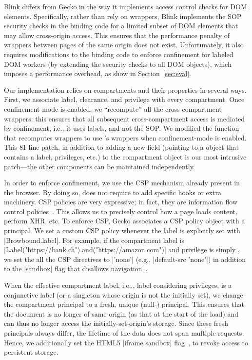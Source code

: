 Blink differs from Gecko in the way it implements access control checks for
DOM elements. 
%
Specifically, rather than rely on wrappers, Blink implements the SOP security
checks in the binding code for a limited subset of DOM elements that may allow
cross-origin access.
%
This ensures that the performance penalty of wrappers between pages of the same
origin does not exist.
%
Unfortunately, it also requires modifications to the binding code to enforce
confinement for labeled DOM workers (by extending the security checks to all
DOM objects), which imposes a  performance overhead, as show in
Section~\ref{sec:eval}.

Our implementation relies on compartments and their properties in
several ways.
%
First, we associate label, clearance, and privilege with every 
compartment.
%
Once confinement-mode is enabled, we ``recompute'' all the
cross-compartment wrappers: this ensures that all subsequent
cross-compartment access is mediated by confinement, i.e., it uses
labels, and not the SOP. %
%
We modified the function that recomputes wrappers to use \sys{}'s
wrappers when confinement-mode is enabled.
%
This 81-line patch, in addition to adding a new field (pointing to a \sys{}
object that contains a label, privileges, etc.) to the compartment
object is our most intrusive patch---the other \sys{} components can be
maintained independently.
 
%
In order to enforce confinement, we use the CSP mechanism already present 
in the browser. 
By doing so, \sys{} does not require to add specific hooks or extra machinery. 
CSP policies are very expressive; in fact, they are
information flow control policies~\cite{yang:2013:towards}. This allows us
to precisely control how a page loads content, perform XHR, etc.
To enforce CSP, Gecko associates a CSP policy object with a principal.
%
We set a custom CSP policy whenever the label is
explicitly set with \js|Browbound.label|.
%
For example, if the compartment label is
\js|Label("https://bank.ch").and("https://amazon.com")| and privilege
is simply , we set the all the CSP directives to
\js|'none'| (e.g., \js|default-src 'none'|) in addition to the
\js|sandbox| flag that disallows
navigation~\cite{csp1.1,whatwg-html,html5}.
%

When the effective compartment label, i.e.., label considering privileges, is
a conjunctive label (or a singleton whose origin is not the initially set), 
we change the compartment principal to a fresh, unique (null-)
principal. 
%
This ensures that the document is no longer of same origin (as that
at the start of the load) and can thus no longer access the
initially-set-origin's storage.
%
Since these fresh principals always differ, the lifetime of the data does not
span multiple requests.
%
Hence, we additionally set the HTML5 \js|iframe sandbox| flag~\cite{html5},
to revoke access to persistent storage.


